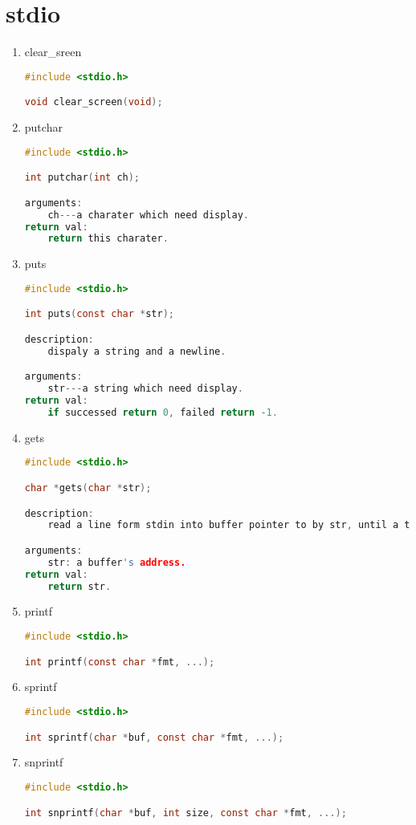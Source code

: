 \section{stdio}
\begin{enumerate}
\item clear\_sreen
\begin{lstlisting}[language=c, numbers=none]
#include <stdio.h>

void clear_screen(void);
\end{lstlisting}

\item putchar
\begin{lstlisting}[language=c, numbers=none]
#include <stdio.h>

int putchar(int ch);

arguments:
	ch---a charater which need display.
return val:
	return this charater.
\end{lstlisting}

\item puts
\begin{lstlisting}[language=c, numbers=none]
#include <stdio.h>

int puts(const char *str);

description:
	dispaly a string and a newline.

arguments:
	str---a string which need display.
return val:
	if successed return 0, failed return -1.
\end{lstlisting}

\item gets
\begin{lstlisting}[language=c, numbers=none]
#include <stdio.h>

char *gets(char *str);

description:
	read a line form stdin into buffer pointer to by str, until a terminating newline.

arguments:
	str: a buffer's address.
return val:
	return str.
\end{lstlisting}

\item printf
\begin{lstlisting}[language=c, numbers=none]
#include <stdio.h>

int printf(const char *fmt, ...);

\end{lstlisting}

\item sprintf
\begin{lstlisting}[language=c, numbers=none]
#include <stdio.h>

int sprintf(char *buf, const char *fmt, ...);

\end{lstlisting}

\item snprintf
\begin{lstlisting}[language=c, numbers=none]
#include <stdio.h>

int snprintf(char *buf, int size, const char *fmt, ...);

\end{lstlisting}

\end{enumerate}

